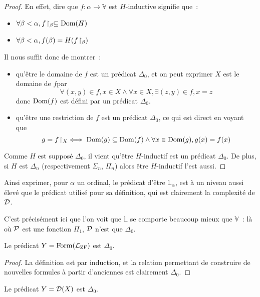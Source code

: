 \begin{proof}
  En effet, dire que $f : \alpha \to \mathbb V$ est $H$-inductive signifie que~:
  \begin{itemize}
  \item $\forall \beta < \alpha, f\!\upharpoonright_{\beta}\subseteq \operatorname{Dom}(H)$
  \item $\forall \beta < \alpha, f(\beta) = H(f\!\upharpoonright_{\beta})$
  \end{itemize}
  Il nous suffit donc de montrer~:
  \begin{itemize}
  \item qu'être le domaine de $f$ est un prédicat $\Delta_0$, et on peut
    exprimer \og $X$ est le domaine de $f$\fg par
    \[\forall (x,y)\in f, x\in X \land \forall x \in X, \exists (z,y)\in f,
    x = z\]
    donc $\operatorname{Dom}(f)$ est défini par un prédicat $\Delta_0$.
  \item qu'être une restriction de $f$ est un prédicat $\Delta_0$, ce qui est
    direct en voyant que
    \[g = f\!\upharpoonright_{X} \iff \operatorname{Dom}(g)\subseteq\operatorname{Dom}(f)\land
    \forall x \in \operatorname{Dom}(g), g(x)=f(x)\]
  \end{itemize}
  Comme $H$ est supposé $\Delta_0$, il vient qu'être $H$-inductif est un
  prédicat $\Delta_0$. De plus, si $H$ est $\Delta_n$ (respectivement
  $\Sigma_n$, $\Pi_n$) alors être $H$-inductif l'est aussi.
\end{proof}

Ainsi exprimer, pour $\alpha$ un ordinal, le prédicat d'être $\mathbb L_\alpha$,
est à un niveau aussi élevé que le prédicat utilisé pour sa définition, qui est
clairement la complexité de $\mathcal{D}$.

C'est précisément ici que l'on voit que $\mathbb L$ se comporte beaucoup mieux
que $\mathbb V$~: là où $\mathcal{P}$ est une fonction $\Pi_1$, $\mathcal{D}$ n'est
que $\Delta_0$.

\begin{property}\label{prop.Form.Delta}
  Le prédicat $Y = \operatorname{Form}(\mathcal L_{\operatorname{ZF}})$ est $\Delta_0$.
\end{property}

\begin{proof}
  La définition est par induction, et la relation permettant de construire
  de nouvelles formules à partir d'anciennes est clairement $\Delta_0$.
\end{proof}

\begin{property}
  Le prédicat $Y = \mathcal{D}(X)$ est $\Delta_0$.
\end{property}

